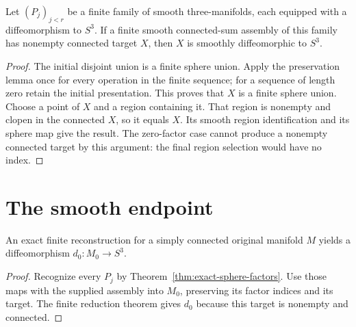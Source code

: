 \begin{theorem}
\label{thm:sphere-finite-reduction}
Let $(P_j)_{j<r}$ be a finite family of smooth three-manifolds, each
equipped with a diffeomorphism to $S^3$.  If a finite smooth
connected-sum assembly of this family has nonempty connected target
$X$, then $X$ is smoothly diffeomorphic to $S^3$.
\end{theorem}

\begin{proof}
The initial disjoint union is a finite sphere union.  Apply the
preservation lemma once for every operation in the finite sequence;
for a sequence of length zero retain the initial presentation.
This proves that $X$ is a finite sphere union.
Choose a point of $X$ and a region containing it.  That region is
nonempty and clopen in the connected $X$, so it equals $X$.
Its smooth region identification and its sphere map give the result.
The zero-factor case cannot produce a nonempty connected target by
this argument: the final region selection would have no index.
\end{proof}

\section{The smooth endpoint}
\label{sec:m74-m75-endpoint}

\begin{corollary}
\label{cor:same-slice-sphere}
An exact finite reconstruction for a simply connected original
manifold $M$ yields a diffeomorphism $d_0:M_0\to S^3$.
\end{corollary}

\begin{proof}
Recognize every $P_j$ by Theorem~\ref{thm:exact-sphere-factors}.
Use those maps with the supplied assembly into $M_0$, preserving its
factor indices and its target.  The finite reduction theorem gives
$d_0$ because this target is nonempty and connected.
\end{proof}

